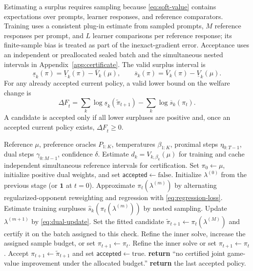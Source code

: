 \documentclass{article}
\theoremstyle{remark}
\theoremstyle{plain}
\begin{document}
Estimating a surplus requires sampling because \eqref{eq:soft-value} contains expectations over prompts, learner responses, and reference comparators. Training uses a consistent plug-in estimate from sampled prompts, $M$ reference responses per prompt, and $L$ learner comparisons per reference response; its finite-sample bias is treated as part of the inexact-gradient error. Acceptance uses an independent or preallocated sealed batch and the simultaneous nested intervals in Appendix~\ref{app:certificate}. The valid surplus interval is
\begin{equation}
\underline s_k(\pi)=\underline V_k(\pi)-\overline V_k(\mu),
\qquad
\overline s_k(\pi)=\overline V_k(\pi)-\underline V_k(\mu).
\label{eq:surplus-ci}
\end{equation}
For any already accepted current policy, a valid lower bound on the welfare change is
\begin{equation}
\underline{\Delta F}_t
=
\sum_k\log \underline s_k(\widetilde\pi_{t+1})
-
\sum_k\log \overline s_k(\pi_t).
\label{eq:welfare-certificate}
\end{equation}
A candidate is accepted only if all lower surpluses are positive and, once an accepted current policy exists, $\underline{\Delta F}_t\ge0$.

\begin{algorithm}[t]
\caption{Constrained Nash Bargaining Preference Optimization}
\label{alg:nbpo}
\begin{algorithmic}[1]
\REQUIRE Reference $\mu$, preference oracles $P_{1:K}$, temperatures $\beta_{1:K}$, proximal steps $\eta_{0:T-1}$, dual steps $\gamma_{0:M-1}$, confidence $\delta$.
\STATE Estimate $d_k=V_{k,\beta_k}(\mu)$ for training and cache independent simultaneous reference intervals for certification.
\STATE Set $\pi_0\leftarrow\mu$, initialize positive dual weights, and set $\mathsf{accepted}\leftarrow\mathrm{false}$.
    \STATE Initialize $\lambda^{(0)}$ from the previous stage (or $\mathbf 1$ at $t=0$).
        \STATE Approximate $\pi_t(\lambda^{(m)})$ by alternating regularized-opponent reweighting and regression with \eqref{eq:regression-loss}.
        \STATE Estimate training surpluses $\widehat s_k(\pi_t(\lambda^{(m)}))$ by nested sampling.
        \STATE Update $\lambda^{(m+1)}$ by \eqref{eq:dual-update}.
    \ENDFOR
    \STATE Set the fitted candidate $\widetilde\pi_{t+1}\leftarrow\pi_t(\lambda^{(M)})$ and certify it on the batch assigned to this check.
        \STATE Refine the inner solve, increase the assigned sample budget, or set $\pi_{t+1}\leftarrow\pi_t$.
        \STATE Refine the inner solve or set $\pi_{t+1}\leftarrow\pi_t$.
    \ELSE
        \STATE Accept $\pi_{t+1}\leftarrow\widetilde\pi_{t+1}$ and set $\mathsf{accepted}\leftarrow\mathrm{true}$.
    \ENDIF
\ENDFOR
{}
    \STATE \textbf{return} ``no certified joint game-value improvement under the allocated budget.''
\ENDIF
\STATE \textbf{return} the last accepted policy.
\end{algorithmic}
\end{algorithm}
\end{document}
